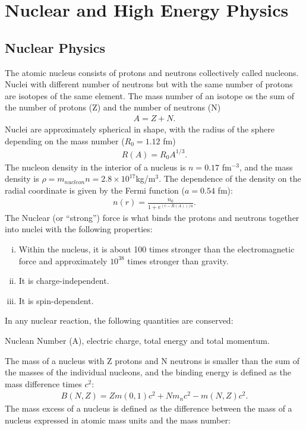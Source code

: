 \chapter{Nuclear and High Energy Physics}
\thispagestyle{fancy}
\section{Nuclear Physics}
The atomic nucleus consists of protons and neutrons collectively called nucleons. Nuclei with different number of neutrons but with the same number of protons are isotopes of the same element. The mass number of an isotope os the sum of the number of protons (Z) and the number of neutrons (N)
\begin{align}
A=Z+N.
\end{align}
Nuclei are approximately spherical in shape, with the radius of the sphere depending on the mass number ($R_0=1.12$ fm)
\begin{align}
R(A)=R_0A^{1/3}.
\end{align}
The nucleon density in the interior of a nucleus is $n=0.17$ fm$^{-3}$, and the mass density is $\rho=m_{nucleon}n=2.8\times 10^{17}$kg/m$^3$. The dependence of the density on the radial coordinate is given by the Fermi function ($a=0.54$ fm):
\begin{align}
n(r)=\frac{n_0}{1+e^{(r-R(A))/a}}.
\end{align}
The Nuclear (or ``strong'') force is what binds the protons and neutrons together into nuclei with the following properties:
\begin{enumerate}[(i)]
	\item Within the nucleus, it is about 100 times stronger than the electromagnetic force and approximately $10^{38}$ times stronger than gravity.
	\item It is charge-independent.
	\item It is spin-dependent.
\end{enumerate}
In any nuclear reaction, the following quantities are conserved: 
\begin{center}
	Nuclean Number (A), electric charge, total energy and total momentum.
\end{center}
The mass of a nucleus with Z protons and N neutrons is smaller than the sum of the masses of the individual nucleons, and the binding energy is defined as the mass difference times $c^2$:
\begin{align}
B(N,Z)=Zm(0,1)c^2+Nm_nc^2-m(N,Z)c^2.
\end{align}
The mass excess of a nucleus is defined as the difference between the mass of a nucleus expressed in atomic mass units and the mass number:
